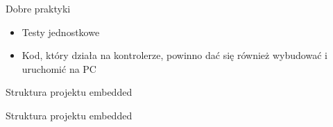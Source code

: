 \documentclass{beamer}
\begin{document}
\begin{frame}[fragile]{Dobre praktyki}
  \begin{itemize}
    \pause
    \item Testy jednostkowe
    \pause
    \item Kod, który działa na kontrolerze, powinno dać się
      również wybudować i uruchomić na PC
  \end{itemize}
\end{frame}

\begin{frame}[fragile]{Struktura projektu embedded}
\end{frame}

\begin{frame}[fragile]{Struktura projektu embedded}
\end{frame}
\end{document}
